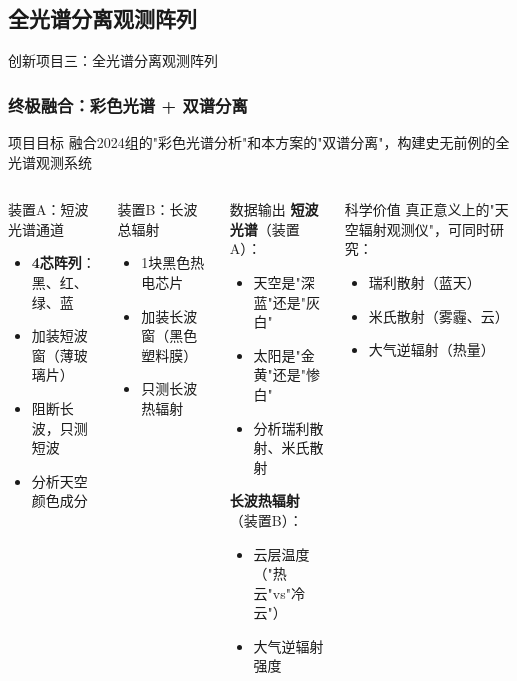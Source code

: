 \documentclass[aspectratio=169,11pt]{ctexbeamer}
\begin{document}
\subsection{全光谱分离观测阵列}

\begin{frame}{创新项目三：全光谱分离观测阵列}
\frametitle{终极融合：彩色光谱 + 双谱分离}
\begin{block}{项目目标}
融合2024组的"彩色光谱分析"和本方案的"双谱分离"，构建史无前例的全光谱观测系统
\end{block}

\begin{columns}
\begin{block}{装置A：短波光谱通道}
\begin{itemize}
    \item \textbf{4芯阵列}：黑、红、绿、蓝
    \item 加装短波窗（薄玻璃片）
    \item 阻断长波，只测短波
    \item 分析天空颜色成分
\end{itemize}
\end{block}

\begin{block}{装置B：长波总辐射}
\begin{itemize}
    \item 1块黑色热电芯片
    \item 加装长波窗（黑色塑料膜）
    \item 只测长波热辐射
\end{itemize}
\end{block}

\begin{block}{数据输出}
\textbf{短波光谱}（装置A）：
\begin{itemize}
    \item 天空是"深蓝"还是"灰白"
    \item 太阳是"金黄"还是"惨白"
    \item 分析瑞利散射、米氏散射
\end{itemize}

\textbf{长波热辐射}（装置B）：
\begin{itemize}
    \item 云层温度（"热云"vs"冷云"）
    \item 大气逆辐射强度
\end{itemize}
\end{block}

\begin{alertblock}{科学价值}
真正意义上的"天空辐射观测仪"，可同时研究：
\begin{itemize}
    \item 瑞利散射（蓝天）
    \item 米氏散射（雾霾、云）
    \item 大气逆辐射（热量）
\end{itemize}
\end{alertblock}
\end{columns}
\end{frame}
\end{document}
